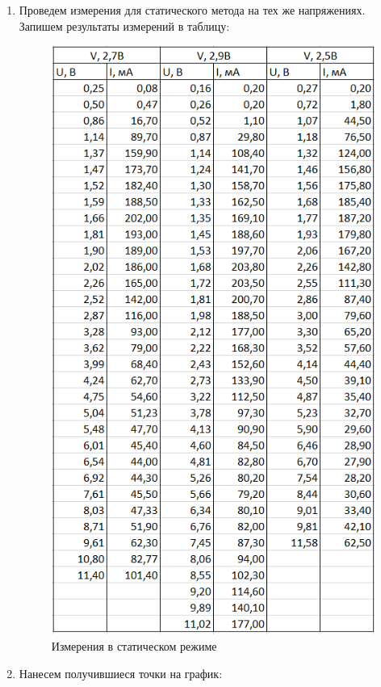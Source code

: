 \documentclass[a4paper,12pt]{article} %
\begin{document}
\begin{enumerate}

\item Проведем измерения для статического метода на тех же напряжениях. Запишем результаты измерений в таблицу:

\begin{figure}[h!]
\centering
\includegraphics[width=0.7\linewidth]{images/table_2.png}
\caption{Измерения в статическом режиме}
\label{table_2}
\end{figure}

\item Нанесем получившиеся точки на график:


\end{enumerate}
\end{document}
